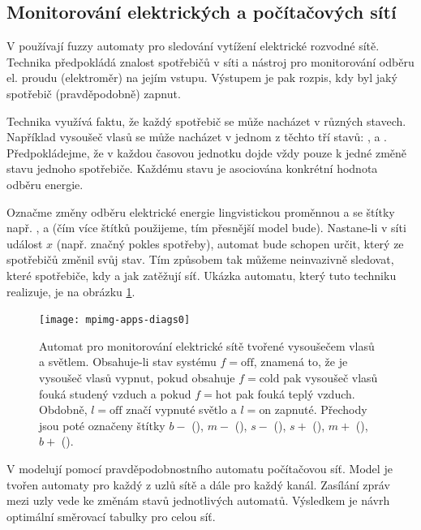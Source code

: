 \documentclass[a4paper,10pt]{article}
\begin{document}
\subsection{Monitorování elektrických a počítačových sítí} \label{subs:MonElComNet}
V \cite{DucMarMar-AlgBasFiStMacFuzTrNoIntrLoaDis} používají fuzzy automaty pro sledování vytížení elektrické rozvodné sítě. Technika předpokládá znalost spotřebičů v síti a nástroj pro monitorování odběru el. proudu (elektroměr) na jejím vstupu. Výstupem je pak rozpis, kdy byl jaký spotřebič (pravděpodobně) zapnut.

Technika využívá faktu, že každý spotřebič se může nacházet v různých stavech. Například vysoušeč vlasů se může nacházet v jednom z těchto tří stavů: ,  a . Předpokládejme, že v každou časovou jednotku dojde vždy pouze k jedné změně stavu jednoho spotřebiče. Každému stavu je asociována konkrétní hodnota odběru energie.

Označme změny odběru elektrické energie lingvistickou proměnnou  a se štítky např. ,  a  (čím více štítků použijeme, tím přesnější model bude). Nastane-li v síti událost $x$ (např. značný pokles spotřeby), automat bude schopen určit, který ze spotřebičů změnil svůj stav. Tím způsobem tak můžeme neinvazivně sledovat, které spotřebiče, kdy a jak zatěžují síť. Ukázka automatu, který tuto techniku realizuje, je na obrázku \ref{img:PowConsAut}.

\begin{figure}
 \centering
 \texttt{[image: mpimg-apps-diags0]}
 \caption[Automat pro monitorování elektrické sítě]{Automat pro monitorování elektrické sítě tvořené vysoušečem vlasů a světlem. Obsahuje-li stav systému $f = \text{off}$, znamená to, že je vysoušeč vlasů vypnut, pokud obsahuje $f = \text{cold}$ pak vysoušeč vlasů fouká studený vzduch a pokud $f = \text{hot}$ pak fouká teplý vzduch. Obdobně, $l = \text{off}$ značí vypnuté světlo a $l = \text{on}$ zapnuté. Přechody jsou poté označeny štítky $b-$ (), $m-$ (), $s-$ (), $s+$ (), $m+$ (), $b+$ ().}
 \label{img:PowConsAut}
\end{figure}


V \cite{Niz-ModComComNetViaPrAu} modelují pomocí pravděpodobnostního automatu počítačovou síť. Model je tvořen automaty pro každý z uzlů sítě a dále pro každý kanál. Zasílání zpráv mezi uzly vede ke změnám stavů jednotlivých automatů. Výsledkem je návrh optimální směrovací tabulky pro celou síť.
\end{document}
